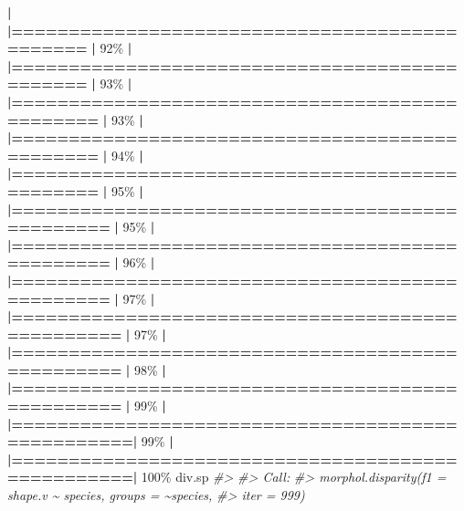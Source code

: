 \documentclass[
]{book}
\newenvironment{Shaded}{\begin{snugshade}}{\end{snugshade}}
\newcommand{\CommentTok}[1]{\textcolor[rgb]{0.56,0.35,0.01}{\textit{#1}}}
\newcommand{\DecValTok}[1]{\textcolor[rgb]{0.00,0.00,0.81}{#1}}
\newcommand{\ErrorTok}[1]{\textcolor[rgb]{0.64,0.00,0.00}{\textbf{#1}}}
\newcommand{\NormalTok}[1]{#1}
\newcommand{\SpecialCharTok}[1]{\textcolor[rgb]{0.81,0.36,0.00}{\textbf{#1}}}
\begin{document}
\begin{Shaded}
\begin{Highlighting}[]
  \SpecialCharTok{|}                                                        
  \ErrorTok{|==============================================}    \ErrorTok{|}  \DecValTok{92}\NormalTok{\%}
  \SpecialCharTok{|}                                                        
  \ErrorTok{|==============================================}    \ErrorTok{|}  \DecValTok{93}\NormalTok{\%}
  \SpecialCharTok{|}                                                        
  \ErrorTok{|===============================================}   \ErrorTok{|}  \DecValTok{93}\NormalTok{\%}
  \SpecialCharTok{|}                                                        
  \ErrorTok{|===============================================}   \ErrorTok{|}  \DecValTok{94}\NormalTok{\%}
  \SpecialCharTok{|}                                                        
  \ErrorTok{|===============================================}   \ErrorTok{|}  \DecValTok{95}\NormalTok{\%}
  \SpecialCharTok{|}                                                        
  \ErrorTok{|================================================}  \ErrorTok{|}  \DecValTok{95}\NormalTok{\%}
  \SpecialCharTok{|}                                                        
  \ErrorTok{|================================================}  \ErrorTok{|}  \DecValTok{96}\NormalTok{\%}
  \SpecialCharTok{|}                                                        
  \ErrorTok{|================================================}  \ErrorTok{|}  \DecValTok{97}\NormalTok{\%}
  \SpecialCharTok{|}                                                        
  \ErrorTok{|=================================================} \ErrorTok{|}  \DecValTok{97}\NormalTok{\%}
  \SpecialCharTok{|}                                                        
  \ErrorTok{|=================================================} \ErrorTok{|}  \DecValTok{98}\NormalTok{\%}
  \SpecialCharTok{|}                                                        
  \ErrorTok{|=================================================} \ErrorTok{|}  \DecValTok{99}\NormalTok{\%}
  \SpecialCharTok{|}                                                        
  \ErrorTok{|==================================================|}  \DecValTok{99}\NormalTok{\%}
  \SpecialCharTok{|}                                                        
  \ErrorTok{|==================================================|} \DecValTok{100}\NormalTok{\%}
\NormalTok{div.sp}
\CommentTok{\#\textgreater{} }
\CommentTok{\#\textgreater{} Call:}
\CommentTok{\#\textgreater{} morphol.disparity(f1 = shape.v \textasciitilde{} species, groups = \textasciitilde{}species,  }
\CommentTok{\#\textgreater{}     iter = 999) }

\end{Highlighting}
\end{Shaded}
\end{document}
